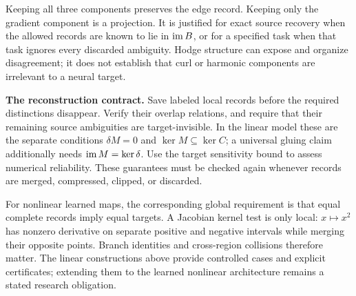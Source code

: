 Keeping all three components preserves the edge record. Keeping only the
gradient component is a projection. It is justified for exact source recovery
when the allowed records are known to lie in $\operatorname{im} B$, or for a specified task
when that task ignores every discarded ambiguity. Hodge structure can expose
and organize disagreement; it does not establish that curl or harmonic
components are irrelevant to a neural target.

\begin{keybox}
\textbf{The reconstruction contract.}
Save labeled local records before the required distinctions disappear.
Verify their overlap relations, and require that their remaining source
ambiguities are target-invisible. In the linear model these are the separate
conditions $\delta M=0$ and $\ker M\subseteq\ker C$; a universal gluing claim
additionally needs $\operatorname{im} M=\ker\delta$. Use the target sensitivity bound to
assess numerical reliability. These guarantees must be checked again whenever
records are merged, compressed, clipped, or discarded.
\end{keybox}

For nonlinear learned maps, the corresponding global requirement is that equal
complete records imply equal targets. A Jacobian kernel test is only local:
$x\mapsto x^2$ has nonzero derivative on separate positive and negative
intervals while merging their opposite points. Branch identities and
cross-region collisions therefore matter. The linear constructions above
provide controlled cases and explicit certificates; extending them to the
learned nonlinear architecture remains a stated research obligation.
